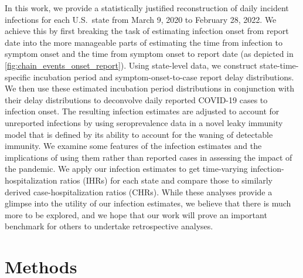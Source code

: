 \documentclass{article}
\begin{document}
In this work, we provide a statistically justified reconstruction of
daily incident infections for each U.S.\ state from March 9, 2020 to February 28, 2022.
We achieve this by first breaking the task of estimating infection onset
from report date into the more manageable parts of estimating the time from
infection to symptom onset and the time from symptom onset to report date (as
depicted in \autoref{fig:chain_events_onset_report}). Using state-level data, we
construct state-time-specific incubation period and
symptom-onset-to-case report delay distributions. We then use these estimated
incubation period distributions in conjunction with their delay distributions to
deconvolve daily reported COVID-19 cases to infection onset. The resulting
infection estimates are adjusted to account for unreported infections by
using seroprevalence data in a novel leaky immunity model that is defined by its
ability to account for the waning of detectable immunity.  
We examine some features of the infection estimates and the implications of
using them rather than reported cases in assessing the impact of the pandemic.
We apply our infection estimates to get time-varying infection-hospitalization
ratios (IHRs) for each state and compare those to similarly derived
case-hospitalization ratios (CHRs).
While these analyses provide a glimpse into the utility of our
infection estimates, we believe that there is much more to be explored, and we hope that
our work will prove an important benchmark for others to undertake retrospective
analyses.

\section{Methods}
\end{document}
